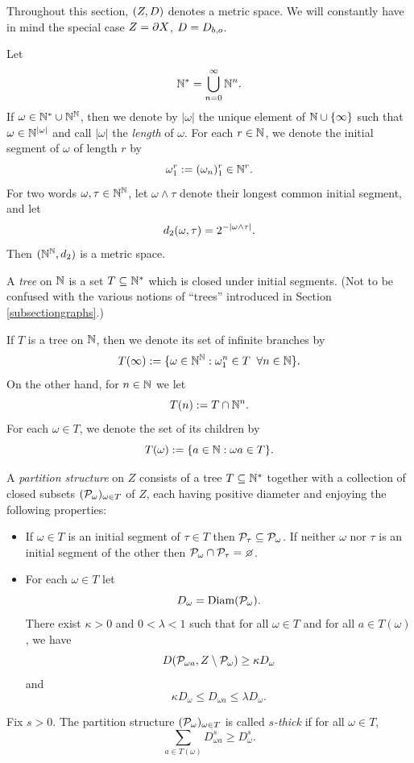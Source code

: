Throughout this section, $(Z,D)$ denotes a metric space. We will constantly have in mind the special case $Z = \partial X$, $D = D_{b,o}$.

\begin{notation}
Let
\[
\N^* = \bigcup_{n = 0}^\infty \N^n.
\]
If $\omega\in\N^*\cup\N^\N$, then we denote by $|\omega|$ the unique element of $\N\cup \{\infty\}$ such that $\omega\in \N^{|\omega|}$ and call $|\omega|$ the \emph{length} of $\omega$. For each $r\in\N$, we denote the initial segment of $\omega$ of length $r$ by
\[
\omega_1^r := (\omega_n)_1^r\in\N^r.
\]
For two words $\omega,\tau\in\N^\N$, let $\omega\wedge\tau$ denote their longest common initial segment, and let
\[
d_2(\omega,\tau) = 2^{-|\omega\wedge\tau|}.
\]
Then $(\N^\N,\dist_2)$ is a metric space.
\end{notation}
\begin{definition}
\label{definitiontree}
A \emph{tree} on $\N$ is a set $T\subset\N^*$ which is closed under initial segments. (Not to be confused with the various notions of ``trees'' introduced in Section \ref{subsectiongraphs}.)
\end{definition}
\begin{notation}
If $T$ is a tree on $\N$, then we denote its set of infinite branches by
\[
T(\infty) := \{\omega\in\N^\N:\omega_1^n\in T\all n\in\N\}.
\]
On the other hand, for $n\in\N$ we let
\[
T(n) := T\cap \N^n.
\]
For each $\omega\in T$, we denote the set of its children by
\[
T(\omega) := \{a\in\N:\omega a\in T\}.
\]
\end{notation}

\begin{definition}
\label{definitionpartitionstructure}
A \emph{partition structure} on $Z$ consists of a tree $T\subset\N^*$ together with a collection of closed subsets $(\mathcal P_\omega)_{\omega\in T}$ of $Z$, each having positive diameter and enjoying the following properties:
\begin{itemize}
\item[(I)] If $\omega\in T$ is an initial segment of $\tau\in T$ then $\mathcal P_\tau\subseteq \mathcal P_\omega$. If neither $\omega$ nor $\tau$ is an initial segment of the other then $\PP_\omega\cap \PP_\tau = \emptyset$.
\item[(II)] For each $\omega\in T$ let
\[
D_\omega = \operatorname{Diam}(\mathcal P_\omega).
\]
There exist $\kappa > 0$ and $0 < \lambda < 1$ such that for all $\omega\in T$ and for all $a\in T(\omega)$, we have 
\begin{equation}\label{kappa}
D(\mathcal P_{\omega a},Z\setminus \mathcal P_\omega) \geq \kappa D_\omega
\end{equation}
and
\begin{equation}\label{lambda}
\kappa D_\omega \leq D_{\omega a} \leq \lambda D_\omega.
\end{equation}
\end{itemize}
Fix $s > 0$. The partition structure $(\mathcal P_\omega)_{\omega\in T}$ is called \emph{$s$-thick} if for all $\omega\in T$, 
\begin{equation}
\label{redistribution}
\sum_{a\in T(\omega)}D_{\omega a}^s \geq D_\omega^s.
\end{equation}
\end{definition}

